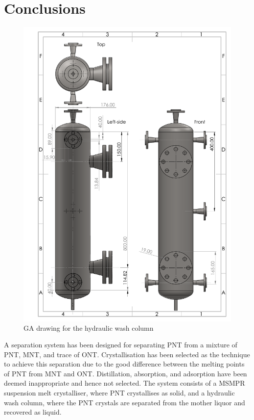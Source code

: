 \section{Conclusions}\label{separation conclusions}

\begin{figure}
    \centering
    \includegraphics[scale=0.3]{chapters/3-separation/figures/Hydraulic_Wash_Column_GA.PDF}
    \caption{GA drawing for the hydraulic wash column}
    \label{fig:wash column GA}
\end{figure} 

A separation system has been designed for separating PNT from a mixture of PNT, MNT, and trace of ONT. Crystallisation has been selected as the technique to achieve this separation due to the good difference between the melting points of PNT from MNT and ONT. Distillation, absorption, and adsorption have been deemed inappropriate and hence not selected. The system consists of a MSMPR suspension melt crystalliser, where PNT crystallises as solid, and a hydraulic wash column, where the PNT crystals are separated from the mother liquor and recovered as liquid. 


